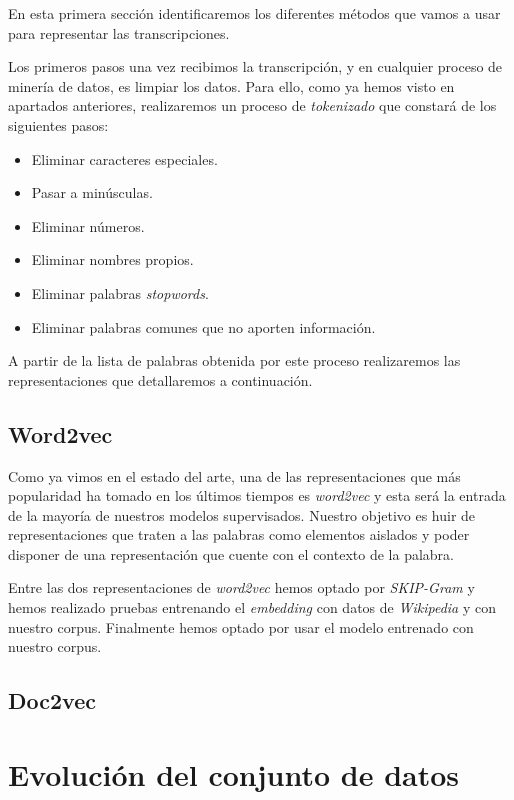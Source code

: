 En esta primera sección identificaremos los diferentes métodos que vamos a usar para representar las transcripciones. 

Los primeros pasos una vez recibimos la transcripción, y en cualquier proceso de minería de datos, es limpiar los datos. Para ello, como ya hemos visto en apartados anteriores, realizaremos un proceso de \textit{tokenizado} que constará de los siguientes pasos: 

\begin{itemize}
\item Eliminar caracteres especiales. 
\item Pasar a minúsculas. 
\item Eliminar números. 
\item Eliminar nombres propios. 
\item Eliminar palabras \textit{stopwords}. 
\item Eliminar palabras comunes que no aporten información.
\end{itemize}

A partir de la lista de palabras obtenida por este proceso realizaremos las representaciones que detallaremos a continuación. 

\subsection{Word2vec}
Como ya vimos en el estado del arte, una de las representaciones que más popularidad ha tomado  en los últimos tiempos es \textit{word2vec} y esta será la entrada de la mayoría de nuestros modelos supervisados. Nuestro objetivo es huir de representaciones que traten a las palabras como elementos aislados y poder disponer de una representación que cuente con el contexto de la palabra.

Entre las dos representaciones de \textit{word2vec} hemos optado por \textit{SKIP-Gram} y hemos realizado pruebas entrenando el \textit{embedding} con datos de \textit{Wikipedia} y con nuestro corpus. Finalmente hemos optado por usar el modelo entrenado con nuestro corpus.

 


\subsection{Doc2vec}



\section{Evolución del conjunto de datos}
\label{section:data:evol}

